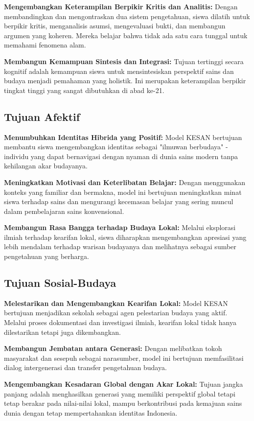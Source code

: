 \documentclass[12pt,a4paper,oneside]{book}
\begin{document}
\textbf{Mengembangkan Keterampilan Berpikir Kritis dan Analitis:} Dengan membandingkan dan mengontraskan dua sistem pengetahuan, siswa dilatih untuk berpikir kritis, menganalisis asumsi, mengevaluasi bukti, dan membangun argumen yang koheren. Mereka belajar bahwa tidak ada satu cara tunggal untuk memahami fenomena alam.

\textbf{Membangun Kemampuan Sintesis dan Integrasi:} Tujuan tertinggi secara kognitif adalah kemampuan siswa untuk mensintesiskan perspektif sains dan budaya menjadi pemahaman yang holistik. Ini merupakan keterampilan berpikir tingkat tinggi yang sangat dibutuhkan di abad ke-21.

\subsection{Tujuan Afektif}

\textbf{Menumbuhkan Identitas Hibrida yang Positif:} Model KESAN bertujuan membantu siswa mengembangkan identitas sebagai "ilmuwan berbudaya" - individu yang dapat bernavigasi dengan nyaman di dunia sains modern tanpa kehilangan akar budayanya.

\textbf{Meningkatkan Motivasi dan Keterlibatan Belajar:} Dengan menggunakan konteks yang familiar dan bermakna, model ini bertujuan meningkatkan minat siswa terhadap sains dan mengurangi kecemasan belajar yang sering muncul dalam pembelajaran sains konvensional.

\textbf{Membangun Rasa Bangga terhadap Budaya Lokal:} Melalui eksplorasi ilmiah terhadap kearifan lokal, siswa diharapkan mengembangkan apresiasi yang lebih mendalam terhadap warisan budayanya dan melihatnya sebagai sumber pengetahuan yang berharga.

\subsection{Tujuan Sosial-Budaya}

\textbf{Melestarikan dan Mengembangkan Kearifan Lokal:} Model KESAN bertujuan menjadikan sekolah sebagai agen pelestarian budaya yang aktif. Melalui proses dokumentasi dan investigasi ilmiah, kearifan lokal tidak hanya dilestarikan tetapi juga dikembangkan.

\textbf{Membangun Jembatan antara Generasi:} Dengan melibatkan tokoh masyarakat dan sesepuh sebagai narasumber, model ini bertujuan memfasilitasi dialog intergenerasi dan transfer pengetahuan budaya.

\textbf{Mengembangkan Kesadaran Global dengan Akar Lokal:} Tujuan jangka panjang adalah menghasilkan generasi yang memiliki perspektif global tetapi tetap berakar pada nilai-nilai lokal, mampu berkontribusi pada kemajuan sains dunia dengan tetap mempertahankan identitas Indonesia.
\end{document}
